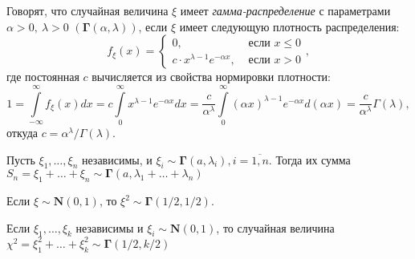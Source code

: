 \begin{defn}
    Говорят, что случайная величина $\xi$ имеет {\it гамма-распределение} с параметрами $\alpha > 0,~ \lambda > 0$ $(\mathbf{\Gamma}(\alpha, \lambda))$, если $\xi$ имеет следующую плотность распределения:
    \begin{equation*}
        f_{\xi}(x)=\left\{\begin{array}{ll}
        0, & \text { если } x \leqslant 0 \\
        c \cdot x^{\lambda-1} e^{-\alpha x}, & \text { если } x>0
        \end{array}\right.,
    \end{equation*}
    где постоянная $c$ вычисляется из свойства нормировки плотности:
    \begin{equation*}
        1=\int\limits_{-\infty}^{\infty} f_{\xi}(x) d x=c \int\limits_{0}^{\infty} x^{\lambda-1} e^{-\alpha x} d x=\frac{c}{\alpha^{\lambda}} \int\limits_{0}^{\infty}(\alpha x)^{\lambda-1} e^{-\alpha x} d(\alpha x)=\frac{c}{\alpha^{\lambda}} \Gamma(\lambda),
    \end{equation*}
    откуда $c=\alpha^{\lambda} / \Gamma(\lambda)$.
\end{defn}

\begin{lem}
    Пусть $\xi_{1}, \ldots, \xi_{n}$ независимы, и $\xi_i \sim \mathbf{\Gamma}(a, \lambda_i), i=\overline{1,n}$. Тогда их сумма $S_{n}=\xi_{1}+\ldots+\xi_{n} \sim \mathbf{\Gamma}(a, \lambda_1 + \ldots + \lambda_n)$
\end{lem}
\begin{lem}
    Если $\xi \sim \mathbf{N}(0,1)$, то $\xi^2 \sim \mathbf{\Gamma}(1/2, 1/2)$.
\end{lem}
\begin{crlr}
    Если $\xi_{1}, \ldots, \xi_{k}$ независимы и $\xi_i \sim \mathbf{N}(0,1)$, то случайная величина $\chi^{2}=\xi_{1}^{2}+\ldots+\xi_{k}^{2} \sim \mathbf{\Gamma}(1/2, k/2)$
\end{crlr}

